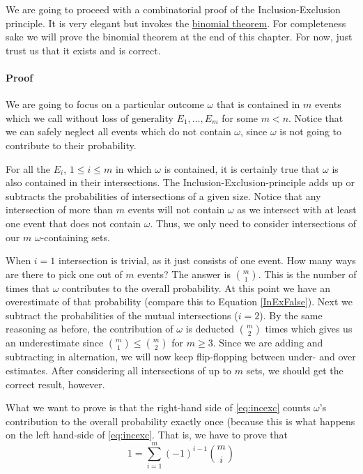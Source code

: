 We are going to proceed with a combinatorial proof of the Inclusion-Exclusion principle. It is
very elegant but invokes the \href{https://en.wikipedia.org/wiki/Binomial_theorem}{binomial theorem}.
For completeness sake we will prove the binomial theorem
at the end of this chapter. For now, just trust us that it exists and is correct.

\paragraph{Proof} We are going to focus on a particular outcome $ \omega $ that is contained in $ m $ events 
which we call without loss of generality $ E_{1}, \ldots, E_{m} $ for some $ m < n $. 
Notice that we can safely neglect all events which do not contain
$ \omega $, since $ \omega $ is not going to contribute to their probability. 

For all the $ E_{i} $, $ 1 \leq i \leq m $ in which $ \omega $ is contained, it is certainly true
that $ \omega $ is also contained in their intersections. The Inclusion-Exclusion-principle
adds up or subtracts the probabilities of intersections of a given size. Notice that any intersection of more
than $ m $ events will not contain $ \omega $ as we intersect with at least one event that does not
contain $ \omega $. Thus, we only need to consider intersections of our $ m $ $ \omega $-containing
sets.

When $ i = 1 $ intersection is trivial, as it just consists of one event. How many ways are there to pick
one out of $ m $ events? The answer is $ \binom{m}{1} $. This is the number of times that $ \omega $
contributes to the overall probability. At this point we have an overestimate of that probability 
(compare this to Equation \eqref{InExFalse}). Next we subtract the probabilities of the mutual intersections ($ i = 2 $).
By the same reasoning as before, the contribution of $ \omega $ is deducted $ \binom{m}{2} $ times
which gives us an underestimate since $ \binom{m}{1} \leq \binom{m}{2} $ for $ m \geq 3 $. Since we
are adding and subtracting in alternation, we will now keep flip-flopping between under- and over
estimates. After considering all intersections of up to $ m $ sets, we should get the correct result,
however.

What we want to prove is that the right-hand side of \eqref{eq:incexc} counts $ \omega $'s contribution 
to the overall probability exactly once (because this is what happens on the left hand-side of \eqref{eq:incexc}.
That is, we have to prove that
\begin{equation} \label{InExProofStep1}
1 = \underset{i=1}{\overset{m}{\sum}}(-1)^{i-1}\binom{m}{i}
\end{equation}

